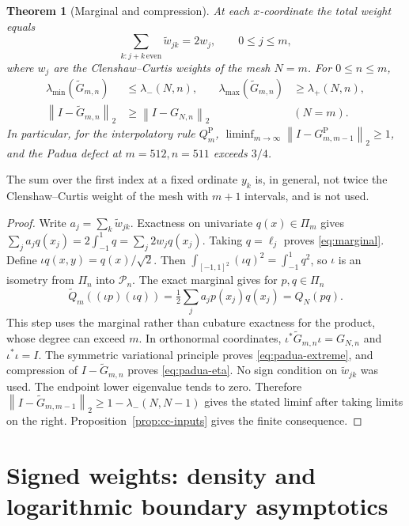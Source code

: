 \documentclass[preprint,12pt,a4paper]{elsarticle}
\newtheorem{theorem}{Theorem}[section]
\theoremstyle{remark}
\newcommand{\Pa}{\mathrm P}
\newcommand{\lamin}{\lambda_{\min}}
\newcommand{\lamax}{\lambda_{\max}}
\newcommand{\norm}[1]{\left\lVert#1\right\rVert}
\begin{document}
\begin{theorem}[Marginal and compression]\label{thm:padua}
At each $x$-coordinate the total weight equals
\begin{equation}\label{eq:marginal}
 \sum_{k:j+k\,\mathrm{even}}\widetilde w_{jk}=2w_j,\qquad0\le j\le m,
\end{equation}
where $w_j$ are the Clenshaw--Curtis weights of the mesh $N=m$.
For $0\le n\le m$,
\begin{align}
 \lamin(\widetilde G_{m,n})&\le\lambda_-(N,n),&
 \lamax(\widetilde G_{m,n})&\ge\lambda_+(N,n),\label{eq:padua-extreme}\\
 \norm{I-\widetilde G_{m,n}}_2&\ge\norm{I-G_{N,n}}_2&&(N=m).\label{eq:padua-eta}
\end{align}
In particular, for the interpolatory rule $Q_m^{\mathrm P}$,
$\liminf_{m\to\infty}\norm{I-G^\Pa_{m,m-1}}_2\ge1$,
and the Padua defect at $m=512,n=511$ exceeds $3/4$.
\end{theorem}
The sum over the first index at a fixed ordinate $y_k$ is, in general, not twice
the Clenshaw--Curtis weight of the mesh with $m+1$ intervals, and is not used.
\begin{proof}
Write $a_j=\sum_k\widetilde w_{jk}$. Exactness on univariate $q(x)\in\Pi_m$ gives
$\sum_j a_jq(x_j)=2\int_{-1}^1q=\sum_j2w_jq(x_j)$.
Taking $q=\ell_j$ proves \eqref{eq:marginal}.
Define $\iota q(x,y)=q(x)/\sqrt2$. Then
$\int_{[-1,1]^2}(\iota q)^2=\int_{-1}^1q^2$, so $\iota$ is an isometry from
$\Pi_n$ into $\mathcal P_n$. The exact marginal gives for $p,q\in\Pi_n$
\[
 \widetilde Q_m((\iota p)(\iota q))=\tfrac12\sum_j a_jp(x_j)q(x_j)=Q_N(pq).
\]
This step uses the marginal rather than cubature exactness for the product,
whose degree can exceed $m$. In orthonormal coordinates,
$\iota^*\widetilde G_{m,n}\iota=G_{N,n}$ and $\iota^*\iota=I$.
The symmetric variational principle proves \eqref{eq:padua-extreme},
and compression of $I-\widetilde G_{m,n}$ proves \eqref{eq:padua-eta}.
No sign condition on $\widetilde w_{jk}$ was used.
The endpoint lower eigenvalue tends to zero. Therefore
$\norm{I-\widetilde G_{m,m-1}}_2\ge1-\lambda_-(N,N-1)$ gives the stated
liminf after taking limits on the right.
Proposition~\ref{prop:cc-inputs} gives the finite consequence.
\end{proof}

\section{Signed weights: density and logarithmic boundary asymptotics}\label{sec:weights}
\end{document}

